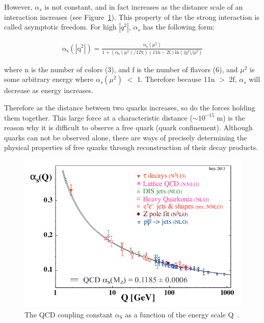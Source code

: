 However, $\alpha_s$ is not constant, and in fact increases as the distance scale of an interaction increases (see Figure~\ref{figs:alphasrunning}).  
This property of the the strong interaction is called asymptotic freedom.  For high $|q^2|$, $\alpha_s$ has the following form:

\begin{eqnarray}
\mathrm{\alpha_{s}(|q^2|)} =  \frac{\mathrm{\alpha_{s}(\mu^{2})}}{\mathrm{1+(\alpha_{s}(\mu^{2})/12\pi)(11n-2f)ln(|q^2|/\mu^{2})}}
\label{eqn:qcdalphas}
\end{eqnarray}  

where n is the number of colors (3), and f is the number of flavors (6), and $\mu^{2}$ is some arbitrary energy where $\alpha_{s}(\mu^{2})$ $<$ 1.
Therefore because 11n $>$ 2f, $\alpha_{s}$ will decrease as energy increases.


Therefore as the distance between two quarks increases, so do the forces holding them together.  
This large force at a characteristic distance ($\sim10^{-15}$ m) is the reason why it is difficult to observe a free quark (quark confinement).  
Although quarks can not be observed alone, there are ways of precisely determining the physical properties of free quarks through reconstruction of their decay products.  




\begin{figure}
\begin{center}
\includegraphics[width=1.0\linewidth]{figs/alphasrunning.png}
\caption{The QCD coupling constant $\alpha_{\mathrm{S}}$ as a function of the energy scale Q~\cite{PDG-2014}.}
\label{figs:alphasrunning}
\end{center}
\end{figure}


